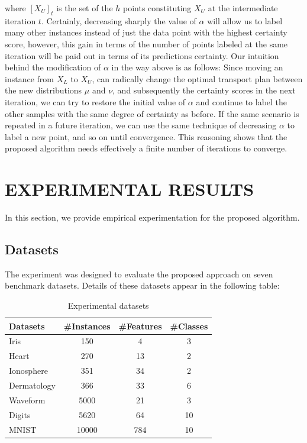 \documentclass[conference]{IEEEtran}
\begin{document}
where $[X_U]_t$ is the set of the $h$ points constituting $X_U$ at the intermediate iteration $t$. Certainly, decreasing sharply the value of $\alpha$ will allow us to label many other instances instead of just the data point with the highest certainty score, however, this gain in terms of the number of points labeled at the same iteration will be paid out in terms of its predictions certainty. Our intuition behind the modification of $\alpha$ in the way above is as follows: Since moving an instance from $X_L$ to $X_U$, can radically change the optimal transport plan between the new distributions $\mu$ and $\nu$, and subsequently the certainty scores in the next iteration,  we can try to restore the initial value of $\alpha$ and continue to label the other samples with the same degree of certainty as before. If the same scenario is repeated in a future iteration, we can use the same technique of decreasing $\alpha$ to label a new point, and so on until convergence. This reasoning shows that the proposed algorithm needs effectively a finite number of iterations to converge.
\section{EXPERIMENTAL RESULTS}
In this section, we provide empirical experimentation for the proposed algorithm. 
\subsection{Datasets} 
The experiment was designed to evaluate the proposed approach on seven benchmark datasets. Details of these  datasets appear in the following table:
\begin{table}[h]
\caption{Experimental datasets}
\centering
\setlength{}
\begin{tabular}{lccc}
\hline
Datasets  \quad \quad   & \#Instances  \quad \quad  & \#Features \quad \quad& \#Classes  \\  
\toprule 
Iris        & 150       & 4      & 3          \\ 
Heart       & 270       & 13     & 2          \\ 
Ionosphere  & 351       & 34     & 2          \\ 
Dermatology & 366       & 33     & 6          \\
Waveform    & 5000      & 21     & 3          \\ 
Digits      & 5620      & 64     & 10         \\ 
MNIST       & 10000     & 784    & 10         \\
\toprule
\end{tabular}
\label{Data}
\end{table}
\end{document}
